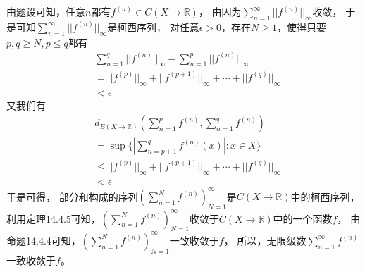 \documentclass{article}
\begin{document}
由题设可知，任意$n$都有$f^{(n)} \in C(X \to \mathbb{R})$，
由因为$\sum \limits_{n=1}^{\infty} ||f^{(n)}||_\infty$收敛，
于是可知$\sum \limits_{n=1}^{\infty} ||f^{(n)}||_\infty$是柯西序列，
对任意$\epsilon > 0$，存在$N \geq 1$，使得只要$p, q  \geq N, p \leq q$都有
\begin{align*}
   & \sum \limits_{n=1}^{q} ||f^{(n)}||_\infty - \sum \limits_{n=1}^{p} ||f^{(n)}||_\infty \\
   & = ||f^{(p)}||_\infty + ||f^{(p+1)}||_\infty + \cdots + ||f^{(q)}||_\infty             \\
   & < \epsilon
\end{align*}
又我们有
\begin{align*}
   & d_{B(X \to \mathbb{R})}(\sum \limits_{n=1}^{p} f^{(n)}, \sum \limits_{n=1}^{q} f^{(n)}) \\
   & = \sup \{|\sum \limits_{n=p+1}^{q} f^{(n)}(x)|: x \in X\}                               \\
   & \leq ||f^{(p)}||_\infty + ||f^{(p+1)}||_\infty + \cdots + ||f^{(q)}||_\infty            \\
   & < \epsilon
\end{align*}
于是可得，
部分和构成的序列$(\sum \limits_{n=1}^{N} f^{(n)})_{N = 1}^\infty$是$C(X \to \mathbb{R})$中的柯西序列，
利用定理14.4.5可知，$(\sum \limits_{n=1}^{N} f^{(n)})_{N = 1}^\infty$收敛于$C(X \to \mathbb{R})$中的一个函数$f$，
由命题14.4.4可知，$(\sum \limits_{n=1}^{N} f^{(n)})_{N = 1}^\infty$一致收敛于$f$，
所以，无限级数$\sum \limits_{n=1}^{\infty} f^{(n)}$一致收敛于$f$。
\end{document}
